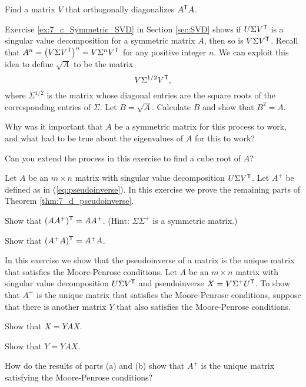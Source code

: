 	\item Find a matrix $V$ that orthogonally diagonalizes $A^{\mathsf{T}}A$. 
	
\item Exercise \ref{ex:7_c_Symmetric_SVD} in Section \ref{sec:SVD} shows if $U \Sigma V^{\mathsf{T}}$ is a singular value decomposition for a symmetric matrix $A$, then so is $V \Sigma V^{\mathsf{T}}$. Recall that $A^n = \left(V \Sigma V^{\mathsf{T}}\right)^n = V \Sigma^n V^{\mathsf{T}}$ for any positive integer $n$. We can exploit this idea to define $\sqrt{A}$ to be the matrix
	\[V \Sigma^{1/2}V^{\mathsf{T}},\]
	where $\Sigma^{1/2}$ is the matrix whose diagonal entries are the square roots of the corresponding entries of $\Sigma$. Let $B = \sqrt{A}$. Calculate $B$ and show that $B^2 = A$. 

	\item Why was it important that $A$ be a symmetric matrix for this process to work, and what had to be true about the eigenvalues of $A$ for this to work? 
	
	\item Can you extend the process in this exercise to find a cube root of $A$? 
	
	\ea


\item Let $A$ be an $m \times n$ matrix with singular value decomposition $U \Sigma V^{\mathsf{T}}$. Let $A^{+}$ be defined as in (\ref{eq:pseudoinverse}). In this exercise we prove the remaining parts of Theorem \ref{thm:7_d_pseudoinverse}.
	\ba
	\item Show that $(AA^{+})^{\mathsf{T}} = AA^{+}$. (Hint: $\Sigma \Sigma^+$ is a symmetric matrix.)

	
	\item Show that $(A^{+}A)^{\mathsf{T}} = A^{+}A$. 

	\ea

\item In this exercise we show that the pseudoinverse of a matrix is the unique matrix that satisfies the Moore-Penrose conditions. Let $A$ be an $m \times n$ matrix with singular value decomposition $U \Sigma V^{\mathsf{T}}$ and pseudoinverse $X = V\Sigma^{+}U^{\mathsf{T}}$. To show that $A^{+}$ is the unique matrix that satisfies the Moore-Penrose conditions, suppose that there is another matrix $Y$ that also satisfies the Moore-Penrose conditions. 
	\ba
	\item Show that $X = YAX$. 
	
	\item Show that $Y = YAX$. 

	\item How do the results of parts (a) and (b) show that $A^{+}$ is the unique matrix satisfying the Moore-Penrose conditions?


